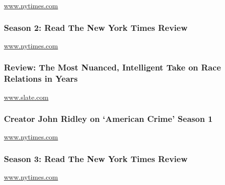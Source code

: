 \href{http://www.nytimes.com}{www.nytimes.com}

\href{https://www.nytimes.com/2016/01/06/arts/television/tv-review-american-crime-season-2.html}{}

\hypertarget{season-2-read-the-new-york-times-review}{%
\subsubsection{Season 2: Read The New York Times
Review}\label{season-2-read-the-new-york-times-review}}

\href{http://www.nytimes.com}{www.nytimes.com}

\href{http://www.slate.com/articles/arts/television/2015/03/abc_s_american_crime_review_this_is_the_most_nuanced_intelligent_take_on.html}{}

\hypertarget{review-the-most-nuanced-intelligent-take-on-race-relations-in-years}{%
\subsubsection{Review: The Most Nuanced, Intelligent Take on Race
Relations in
Years}\label{review-the-most-nuanced-intelligent-take-on-race-relations-in-years}}

\href{http://www.slate.com}{www.slate.com}

\href{https://www.nytimes.com/2015/03/04/arts/television/american-crime-john-ridleys-new-series-on-abc.html}{}

\hypertarget{creator-john-ridley-on-american-crime-season-1}{%
\subsubsection{Creator John Ridley on `American Crime' Season
1}\label{creator-john-ridley-on-american-crime-season-1}}

\href{http://www.nytimes.com}{www.nytimes.com}

\href{https://www.nytimes.com/2017/03/09/arts/television/review-american-crime-season-3-abc.html}{}

\hypertarget{season-3-read-the-new-york-times-review}{%
\subsubsection{Season 3: Read The New York Times
Review}\label{season-3-read-the-new-york-times-review}}

\href{http://www.nytimes.com}{www.nytimes.com}

